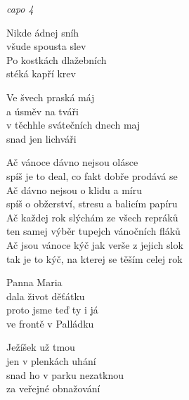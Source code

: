 \re{}
\textit{capo 4}

\ve{}
Nikde ádnej sníh\\
všude spousta slev\\
Po kostkách dlažebních\\
stéká kapří krev

\ve{}
Ve švech praská máj\\
a úsměv na tváři\\
v těchhle svátečních dnech maj\\
snad jen lichváři

\cho{}
Ač vánoce dávno nejsou olásce\\
spíš je to deal, co fakt dobře prodává se\\
Ač dávno nejsou o klidu a míru\\
spíš o obžerství, stresu a balicím papíru\\
Ač každej rok slýchám ze všech repráků\\
ten samej výběr tupejch vánočních fláků\\
Ač jsou vánoce kýč jak verše z jejich slok\\
tak je to kýč, na kterej se těším celej rok

\ve{}
Panna Maria\\
dala život děťátku\\
proto jsme teď ty i já\\
ve frontě v Palládku

\ve{}
Ježíšek už tmou\\
jen v plenkách uhání\\
snad ho v parku nezatknou\\
za veřejné obnažování

\cho{}

\esong{}
